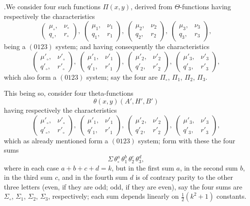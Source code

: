 \documentclass[11pt]{article}
\begin{document}
\medskip

.\quad We consider four such functions $\Pi(x,y)$, derived from $\Theta$-functions having respectively the characteristics
\[
\begin{pmatrix} \mu_{\circ}, & \nu_{\circ} \\ q_{\circ}, & r_{\circ} \end{pmatrix},\;
\begin{pmatrix} \mu_1, & \nu_1 \\ q_1, & r_1 \end{pmatrix},\;
\begin{pmatrix} \mu_2, & \nu_2 \\ q_2, & r_2 \end{pmatrix},\;
\begin{pmatrix} \mu_3, & \nu_3 \\ q_3, & r_3 \end{pmatrix},
\]
being a $(0123)$ system; and having consequently the characteristics
\[
\begin{pmatrix} \mu'_{\circ}, & \nu'_{\circ} \\ q'_{\circ}, & r'_{\circ} \end{pmatrix},\;
\begin{pmatrix} \mu'_1, & \nu'_1 \\ q'_1, & r'_1 \end{pmatrix},\;
\begin{pmatrix} \mu'_2, & \nu'_2 \\ q'_2, & r'_2 \end{pmatrix},\;
\begin{pmatrix} \mu'_3, & \nu'_3 \\ q'_3, & r'_3 \end{pmatrix},
\]
which also form a $(0123)$ system; say the four are $\Pi_{\circ}$, $\Pi_1$, $\Pi_2$, $\Pi_3$.

This being so, consider four theta-functions
\[
\theta(x,y)(A',H',B')
\]
having respectively the characteristics
\[
\begin{pmatrix} \mu'_{\circ}, & \nu'_{\circ} \\ q'_{\circ}, & r'_{\circ} \end{pmatrix},\;
\begin{pmatrix} \mu'_1, & \nu'_1 \\ q'_1, & r'_1 \end{pmatrix},\;
\begin{pmatrix} \mu'_2, & \nu'_2 \\ q'_2, & r'_2 \end{pmatrix},\;
\begin{pmatrix} \mu'_3, & \nu'_3 \\ q'_3, & r'_3 \end{pmatrix},
\]
which as already mentioned form a $(0123)$ system; form with these the four sums
\[
\Sigma\,\theta_{\circ}^{a}\,\theta_1^{b}\,\theta_2^{c}\,\theta_3^{d},
\]
where in each case $a+b+c+d = k$, but in the first sum $a$, in the second sum $b$, in the third sum $c$, and in the fourth sum $d$ is of contrary parity to the other three letters (even, if they are odd; odd, if they are even), say the four sums are $\Sigma_{\circ}$, $\Sigma_1$, $\Sigma_2$, $\Sigma_3$, respectively; each sum depends linearly on $\tfrac{1}{2}(k^2+1)$ constants.
\end{document}
